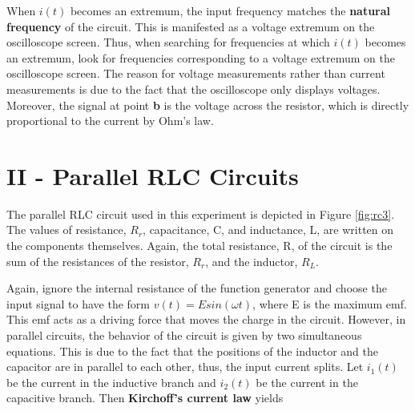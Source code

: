 When $i(t)$ becomes an extremum, the input frequency matches the {\bf natural frequency} of the circuit. This is manifested as a voltage extremum on the oscilloscope screen. Thus, when searching for frequencies at which $i(t)$ becomes an extremum, look for frequencies corresponding to a voltage extremum on the oscilloscope screen. The reason for voltage measurements rather than current measurements is due to the fact that the oscilloscope only displays voltages. Moreover, the signal at point {\bf b} is the voltage across the resistor, which is directly proportional to the current by Ohm's law.

\section{II - Parallel RLC Circuits}
The parallel RLC circuit used in this experiment is depicted in Figure \ref{fig:rc3}. The values of resistance, $R_r$, capacitance, C, and inductance, L, are written on the components themselves. Again, the total resistance, R, of the circuit is the sum of the resistances of the resistor, $R_r$, and the inductor, $R_L$.

Again, ignore the internal resistance of the function generator and choose the input signal to have the form $v(t)=Esin(\omega t)$, where E is the maximum emf. This emf acts as a driving force that moves the charge in the circuit. However, in parallel circuits, the behavior of the circuit is given by two simultaneous equations. This is due to the fact that the positions of the inductor and the capacitor are in parallel to each other, thus, the input current splits. Let $i_1(t)$ be the current in the inductive branch and $i_2(t)$ be the current in the capacitive branch. Then {\bf Kirchoff's current law} yields

